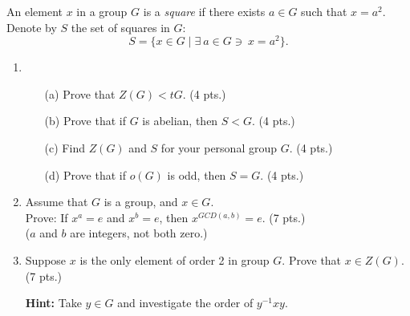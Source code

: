 \begin{definition}
An element \( x \) in a group \( G \) is a \textit{square} if there exists \( a \in G \) such that \( x = a^2 \). Denote by \( S \) the set of squares in \( G \):
\[
S = \{ x \in G \mid \exists \ a \in G \ni \  x = a^2 \}.
\]
\end{definition}
\vspace{0.1in}
\begin{enumerate}
    \setlength{\itemsep}{15pt} %
    \item
    \begin{enumerate}
        \setlength{\itemsep}{10pt} %
        \item[(a)] Prove that \( Z(G) < t G \). \hfill (4 pts.)
        \item[(b)] Prove that if \( G \) is abelian, then \( S < G \). \hfill (4 pts.)
        \item[(c)] Find \( Z(G) \) and \( S \) for your personal group \( G \). \hfill (4 pts.)
        \item[(d)] Prove that if \( o(G) \) is odd, then \( S = G \). \hfill (4 pts.)
    \end{enumerate} 
    
    \item Assume that \( G \) is a group, and \( x \in G \). \\
    \noindent Prove: If \( x^a = e \) and \( x^b = e \), then \( x^{GCD(a,b)} = e \). \hfill (7 pts.) \\
    (\( a \) and \( b \) are integers, not both zero.)
    
    \item Suppose \( x \) is the only element of order 2 in group \( G \). Prove that \( x \in Z(G) \). \hfill (7 pts.)

    \textbf{Hint:} Take \( y \in G \) and investigate the order of \( y^{-1}xy \).
\end{enumerate}

